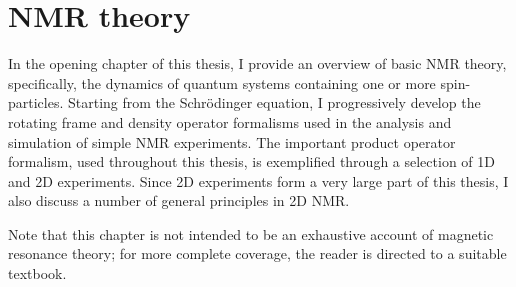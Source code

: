 \chapter{NMR theory}
\label{chpt:theory}

In the opening chapter of this thesis, I provide an overview of basic NMR theory, specifically, the dynamics of quantum systems containing one or more spin-\half{} particles.
Starting from the Schr\"odinger equation, I progressively develop the rotating frame and density operator formalisms used in the analysis and simulation of simple NMR experiments.
The important product operator formalism, used throughout this thesis, is exemplified through a selection of 1D and 2D experiments.
Since 2D experiments form a very large part of this thesis, I also discuss a number of general principles in 2D NMR.

Note that this chapter is not intended to be an exhaustive account of magnetic resonance theory; for more complete coverage, the reader is directed to a suitable textbook.

\clearpage






\printbibliography[heading=subbibnumbered]{}
